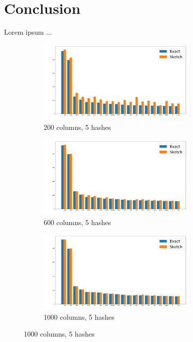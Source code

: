 \documentclass[shortpaper]{revdetua}
\begin{document}
\section{Conclusion}

Lorem ipsum ...


 

\clearpage
\appendix

\begin{figure}[ht]
    \onecolumn
    \begin{subfigure}[t]{0.5\textwidth}
        \includegraphics[height=1.6in]{englishAlice200_5.png}
        \caption{200 columns, 5 hashes} 
    \end{subfigure}
    \begin{subfigure}[t]{0.5\textwidth}
        \includegraphics[height=1.6in]{englishAlice600_5.png}
        \caption{600 columns, 5 hashes}
    \end{subfigure}
    \begin{subfigure}[t]{0.5\textwidth}
        \includegraphics[height=1.6in]{englishAlice1000_5.png}
        \caption{1000 columns, 5 hashes}
    \end{subfigure}

\end{figure}
\end{document}
